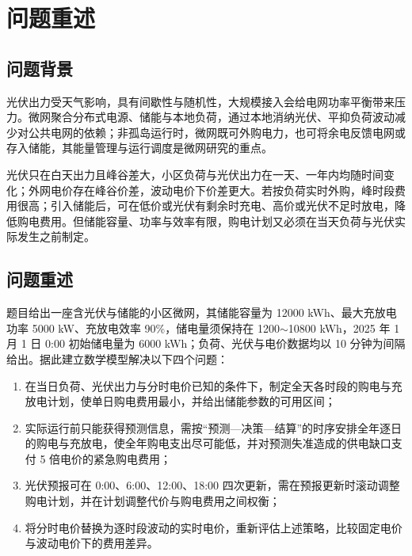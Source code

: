 
\section{问题重述}

\subsection{问题背景}

光伏出力受天气影响，具有间歇性与随机性，大规模接入会给电网功率平衡带来压力。微网聚合分布式电源、储能与本地负荷\cite{luzongxiang2007}，通过本地消纳光伏、平抑负荷波动减少对公共电网的依赖；非孤岛运行时，微网既可外购电力，也可将余电反馈电网或存入储能\cite{yangxinfa2014,wuxiong2014}，其能量管理与运行调度是微网研究的重点。

光伏只在白天出力且峰谷差大，小区负荷与光伏出力在一天、一年内均随时间变化；外网电价存在峰谷价差，波动电价下价差更大\cite{zhangqin2008}。若按负荷实时外购，峰时段费用很高；引入储能后，可在低价或光伏有剩余时充电、高价或光伏不足时放电，降低购电费用\cite{zhoulin2011,sangbingyu2014}。但储能容量、功率与效率有限，购电计划又必须在当天负荷与光伏实际发生之前制定。

\subsection{问题重述}

题目给出一座含光伏与储能的小区微网，其储能容量为 12000 kWh、最大充放电功率 5000 kW、充放电效率 90\%，储电量须保持在 1200$\sim$10800 kWh，2025 年 1 月 1 日 0:00 初始储电量为 6000 kWh；负荷、光伏与电价数据均以 10 分钟为间隔给出。据此建立数学模型解决以下四个问题：

\begin{enumerate}
  \item 在当日负荷、光伏出力与分时电价已知的条件下，制定全天各时段的购电与充放电计划，使单日购电费用最小，并给出储能参数的可用区间；
  \item 实际运行前只能获得预测信息，需按“预测—决策—结算”的时序安排全年逐日的购电与充放电，使全年购电支出尽可能低，并对预测失准造成的供电缺口支付 5 倍电价的紧急购电费用；
  \item 光伏预报可在 0:00、6:00、12:00、18:00 四次更新，需在预报更新时滚动调整购电计划，并在计划调整代价与购电费用之间权衡；
  \item 将分时电价替换为逐时段波动的实时电价，重新评估上述策略，比较固定电价与波动电价下的费用差异。
\end{enumerate}
